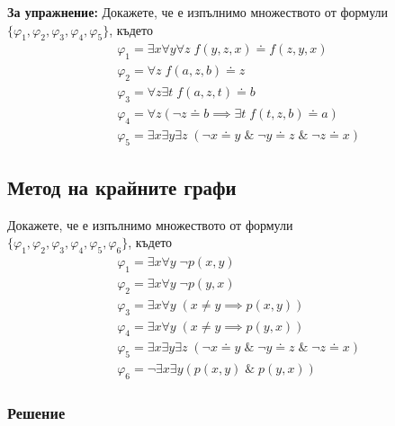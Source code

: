 \documentclass[17pt]{extarticle}
\begin{document}
\par \textbf{За упражнение:}
Докажете, че е изпълнимо множеството от формули
\(\{\varphi_1, \varphi_2, \varphi_3, \varphi_4, \varphi_5\}\), където
\begin{align*}
    & \varphi_1 = \exists x \forall y \forall z \; f(y, z, x) \doteq f(z, y, x) \\
    & \varphi_2 = \forall z \; f(a, z, b) \doteq z \\
    & \varphi_3 = \forall z \exists t \; f(a, z, t) \doteq b \\
    & \varphi_4 = \forall z  (\lnot z \doteq b \implies \exists t \; f(t, z, b) \doteq a) \\
    & \varphi_5 = \exists x \exists y \exists z \; (\lnot x \doteq y \;\&\; \lnot y \doteq z \;\&\; \lnot z \doteq x)
\end{align*}

\subsection{Метод на крайните графи}
Докажете, че е изпълнимо множеството от формули \\
\(\{\varphi_1, \varphi_2, \varphi_3, \varphi_4, \varphi_5, \varphi_6\}\), където
\begin{align*}
    & \varphi_1 = \exists x \forall y \; \lnot p(x, y) \\
    & \varphi_2 = \exists x \forall y \; \lnot p(y, x) \\
    & \varphi_3 = \exists x \forall y \; (x \neq y \implies p(x, y)) \\
    & \varphi_4 = \exists x \forall y \; (x \neq y \implies p(y, x)) \\
    & \varphi_5 = \exists x \exists y \exists z \; (\lnot x \doteq y \;\&\; \lnot y \doteq z \;\&\; \lnot z \doteq x) \\
    & \varphi_6 = \lnot \exists x \exists y (p(x, y) \;\&\; p(y, x))
\end{align*}
\subsubsection{Решение}

\begin{center}
\end{center}
\end{document}
